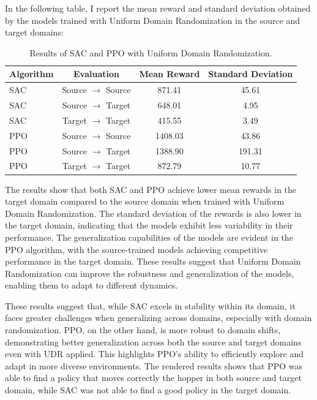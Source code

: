 \documentclass[12pt]{article}
\begin{document}
In the following table, I report the mean reward and standard deviation obtained by the models trained with Uniform Domain Randomization in the source and target domains:

\begin{table}[H]
    \centering
    \begin{tabular}{|l|c|c|c|}
        \hline
        \textbf{Algorithm} & \textbf{Evaluation} & \textbf{Mean Reward} & \textbf{Standard Deviation} \\ \hline
        SAC & Source $\rightarrow$ Source & 871.41 & 45.61 \\ 
        SAC & Source $\rightarrow$ Target & 648.01 & 4.95 \\ 
        SAC & Target $\rightarrow$ Target & 415.55 & 3.49 \\ \hline
        PPO & Source $\rightarrow$ Source & 1408.03 & 43.86 \\ 
        PPO & Source $\rightarrow$ Target & 1388.90 & 191.31 \\ 
        PPO & Target $\rightarrow$ Target & 872.79 & 10.77 \\ \hline
    \end{tabular}
    \caption{Results of SAC and PPO with Uniform Domain Randomization.}
    \label{tab:results_udr}
\end{table}

The results show that both SAC and PPO achieve lower mean rewards in the target domain compared to the source domain when trained with Uniform Domain Randomization. The standard deviation of the rewards is also lower in the target domain, indicating that the models exhibit less variability in their performance. The generalization capabilities of the models are evident in the PPO algorithm, with the source-trained models achieving competitive performance in the target domain. These results suggest that Uniform Domain Randomization can improve the robustness and generalization of the models, enabling them to adapt to different dynamics.

These results suggest that, while SAC excels in stability within its domain, it faces greater challenges when generalizing across domains, especially with domain randomization. PPO, on the other hand, is more robust to domain shifts, demonstrating better generalization across both the source and target domains even with UDR applied. This highlights PPO’s ability to efficiently explore and adapt in more diverse environments. The rendered results shows that PPO was able to find a policy that moves correctly the hopper in both source and target domain, while SAC was not able to find a good policy in the target domain.
\end{document}
